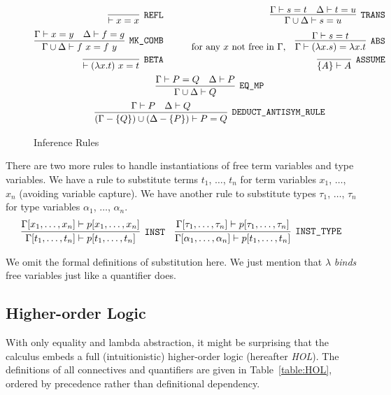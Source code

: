 \begin{figure}
  \begin{gather*}
    \begin{aligned}
      \infer[\code{REFL}]{\vdash x = x}{} &\qquad&
      \infer[\code{TRANS}]{\Gamma\cup\Delta\vdash s=u}{\Gamma\vdash s=t&\Delta\vdash t=u}\\
      \infer[\code{MK\_COMB}]{\Gamma\cup\Delta\vdash f\ x=f\ y}{\Gamma\vdash x = y & \Delta \vdash f = g} &&
      \text{for any $x$ not free in $\Gamma$,}\quad\infer[\code{ABS}]{\Gamma \vdash (\lambda x. s) = \lambda x. t}{\Gamma \vdash s = t}\\
      \infer[\code{BETA}]{\vdash (\lambda x. t)\ x = t}{}&&
      \infer[\code{ASSUME}]{\{A\} \vdash A}{}
    \end{aligned}\\
    \infer[\code{EQ\_MP}]{\Gamma\cup\Delta\vdash Q}{\Gamma\vdash P = Q & \Delta\vdash P}\\
    \infer[\code{DEDUCT\_ANTISYM\_RULE}]{(\Gamma - \{Q\})\cup(\Delta - \{P\})\vdash P = Q}{\Gamma\vdash P & \Delta\vdash Q}\\
  \end{gather*}
  \caption{Inference Rules}
  \label{fig:HOLInferenceRules}
\end{figure}

There are two more rules to handle instantiations of free term variables and type variables. We have a rule to substitute terms $t_1$, $\ldots$, $t_n$ for term variables $x_1$, $\ldots$, $x_n$ (avoiding variable capture). We have another rule to substitute types $\tau_1$, $\ldots$, $\tau_n$ for type variables $\alpha_1$, $\ldots$, $\alpha_n$.
\begin{align*}
  \infer[\code{INST}]{\Gamma[t_1,\ldots,t_n]
    \vdash p[t_1,\ldots,t_n]}
  {\Gamma[x_1,\ldots,x_n]\vdash p[x_1,\ldots,x_n]}&&
  \infer[\code{INST\_TYPE}]{\Gamma[\alpha_1,\ldots,\alpha_n]
    \vdash p[t_1,\ldots,t_n]}
  {\Gamma[\tau_1,\ldots,\tau_n]\vdash p[\tau_1,\ldots,\tau_n]}
\end{align*}

We omit the formal definitions of substitution here. We just mention that $\lambda$ \emph{binds} free variables just like a quantifier does.

\subsection{Higher-order Logic}
With only equality and lambda abstraction, it might be surprising that the calculus embeds a full (intuitionistic) higher-order logic (hereafter \emph{HOL}). The definitions of all connectives and quantifiers are given in Table~\ref{table:HOL}, ordered by precedence rather than definitional dependency.

